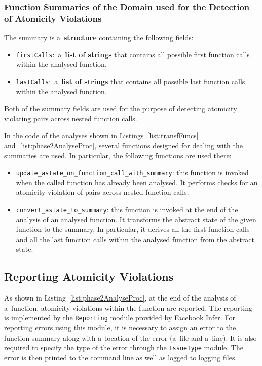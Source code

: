 \subsubsection{%
    Function Summaries of the Domain used for the Detection of Atomicity
    Violations
}

The summary is a~\textbf{structure} containing the following fields:
\begin{itemize}
    \item
        \texttt{firstCalls}:~a~\textbf{list of strings} that contains
        all possible first function calls within the analysed function.

    \item
        \texttt{lastCalls}:~a~\textbf{list of strings} that contains 
        all possible last function calls within the analysed function.
\end{itemize}
Both of the summary fields are used for the purpose of detecting atomicity
violating pairs across nested function calls.

In the code of the analyses shown in Listings~\ref{list:transfFuncs} 
and~\ref{list:phase2AnalyseProc}, several functions designed for dealing 
with the summaries are used. In particular, the following functions are 
used there:
\begin{itemize}
    \item
        \texttt{update\_astate\_on\_function\_call\_with\_summary}: this
        function is invoked when the called function has already been 
        analysed. It performs checks for an atomicity violation of pairs
        across nested function calls.

    \item
        \texttt{convert\_astate\_to\_summary}: this function is invoked at 
        the end of the analysis of an analysed function. It transforms the
        abstract state of the given function to the summary. In particular, 
        it derives all the first function calls and all the last function 
        calls within the analysed function from the abstract state.
\end{itemize}


\subsection{Reporting Atomicity Violations}
\label{sec:implementPhase2Report}

As shown in Listing~\ref{list:phase2AnalyseProc}, at the
end of the analysis of a~function, atomicity violations within
the function are reported. The reporting is implemented by the 
\texttt{Reporting} module provided by Facebook Infer. For reporting 
errors using this module, it is necessary to assign an error to the 
function summary along with a~location of the error (a~file and a~line). 
It is also required to specify the type of the error through the
\texttt{IssueType} module. The error is then printed to the command line
as well as logged to logging files.

